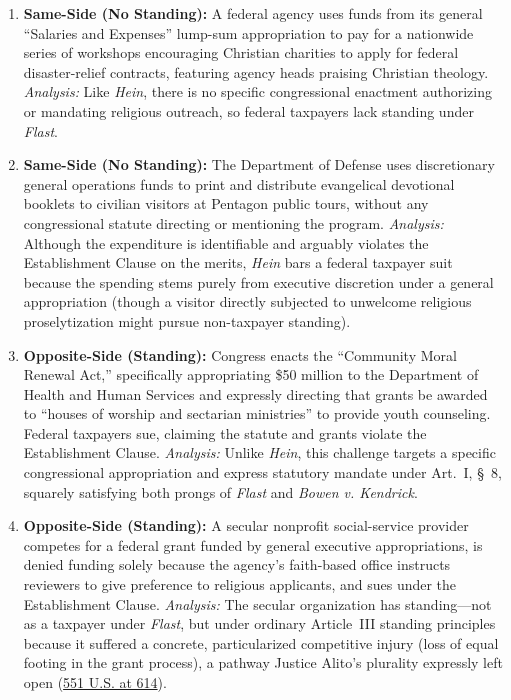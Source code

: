 \documentclass[12pt]{article}
\begin{document}
\begin{enumerate}
    \item \textbf{Same-Side (No Standing):} A federal agency uses funds from its general ``Salaries and Expenses'' lump-sum appropriation to pay for a nationwide series of workshops encouraging Christian charities to apply for federal disaster-relief contracts, featuring agency heads praising Christian theology. \textit{Analysis:} Like \textit{Hein}, there is no specific congressional enactment authorizing or mandating religious outreach, so federal taxpayers lack standing under \textit{Flast}.
    \item \textbf{Same-Side (No Standing):} The Department of Defense uses discretionary general operations funds to print and distribute evangelical devotional booklets to civilian visitors at Pentagon public tours, without any congressional statute directing or mentioning the program. \textit{Analysis:} Although the expenditure is identifiable and arguably violates the Establishment Clause on the merits, \textit{Hein} bars a federal taxpayer suit because the spending stems purely from executive discretion under a general appropriation (though a visitor directly subjected to unwelcome religious proselytization might pursue non-taxpayer standing).
    \item \textbf{Opposite-Side (Standing):} Congress enacts the ``Community Moral Renewal Act,'' specifically appropriating \$50 million to the Department of Health and Human Services and expressly directing that grants be awarded to ``houses of worship and sectarian ministries'' to provide youth counseling. Federal taxpayers sue, claiming the statute and grants violate the Establishment Clause. \textit{Analysis:} Unlike \textit{Hein}, this challenge targets a specific congressional appropriation and express statutory mandate under Art.~I, \S~8, squarely satisfying both prongs of \textit{Flast} and \textit{Bowen v. Kendrick}.
    \item \textbf{Opposite-Side (Standing):} A secular nonprofit social-service provider competes for a federal grant funded by general executive appropriations, is denied funding solely because the agency's faith-based office instructs reviewers to give preference to religious applicants, and sues under the Establishment Clause. \textit{Analysis:} The secular organization has standing---not as a taxpayer under \textit{Flast}, but under ordinary Article~III standing principles because it suffered a concrete, particularized competitive injury (loss of equal footing in the grant process), a pathway Justice Alito's plurality expressly left open (\href{https://supreme.justia.com/cases/federal/us/551/587/}{551 U.S. at 614}).

\end{enumerate}
\end{document}
